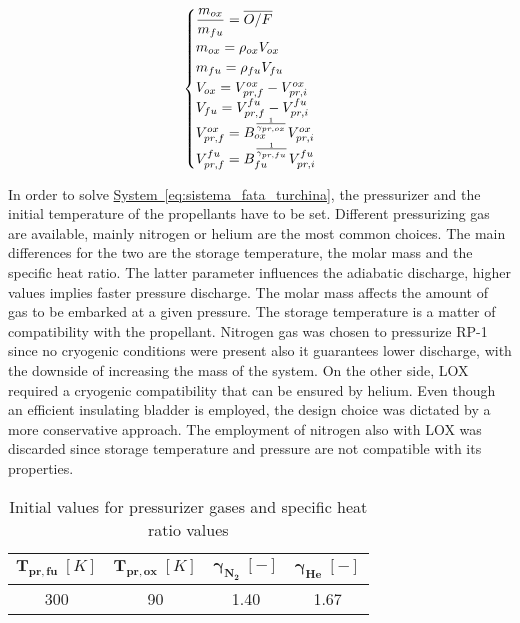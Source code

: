 \begin{equation}
    \begin{cases}
    \renewcommand{\arraystretch}{50}
    \dfrac{m_{ox}}{m_{fu}} = \overline{O/F}\\
     m_{ox} = \rho_{ox}V_{ox}\\
     m_{fu} = \rho_{fu}V_{fu}\\
     V_{ox} = V_{pr, f}^{ox} - V_{pr, i}^{ox}\\
     V_{fu} = V_{pr, f}^{fu} - V_{pr, i}^{fu}\\
     V_{pr,f}^{ox} = B_{ox}^{\frac{1}{\gamma_{pr,ox}}}V_{pr, i}^{ox}\\
     V_{pr,f}^{fu} = B_{fu}^{\frac{1}{\gamma_{pr,fu}}}V_{pr, i}^{fu}\\
     \end{cases}\
     \label{eq:sistema_fata_turchina}
\end{equation}

\vspace{0.15cm}

In order to solve \hyperref[eq:sistema_fata_turchina]{System~\ref*{eq:sistema_fata_turchina}}, the pressurizer and the initial temperature of the propellants have to be set. Different pressurizing gas are available, mainly nitrogen or helium are the most common choices. The main differences for the two are the storage temperature, the molar mass and the specific heat ratio. The latter parameter influences the adiabatic discharge, higher values implies faster pressure discharge. The molar mass affects the amount of gas to be embarked at a given pressure. The storage temperature is a matter of compatibility with the propellant. Nitrogen gas was chosen to pressurize RP-1 since no cryogenic conditions were present also it guarantees lower discharge, with the downside of increasing the mass of the system. On the other side, LOX required a cryogenic compatibility that can be ensured by helium. Even though an efficient insulating bladder is employed, the design choice was dictated by a more conservative approach.
The employment of nitrogen also with LOX was discarded since storage temperature and pressure are not compatible with its properties\cite{nist}. 
\begin{table}[H]
    \renewcommand{\arraystretch}{1.2}
    \centering
    \begin{tabular}{|c|c|c|c|}
        \hline
        $\boldsymbol{T_{pr,fu}} \; [K]$ & $\boldsymbol{T_{pr,ox}} \; [K]$ & $\boldsymbol{\gamma_{N_2}} \; [-]$  & $\boldsymbol{\gamma_{He}} \; [-]$ \\
        \hline
        \hline
        300 & 90 & 1.40 & 1.67 \\
        \hline
    \end{tabular}
    \caption{Initial values for pressurizer gases and specific heat ratio values}
    \label{table:press_value}
\end{table}

